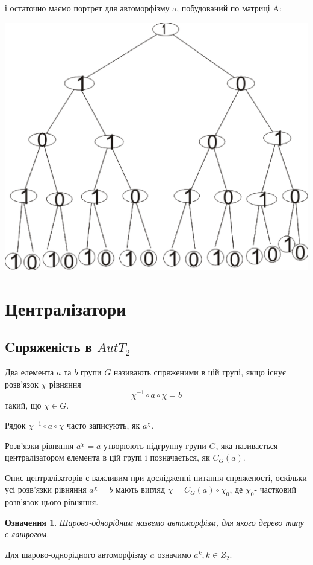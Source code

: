 \documentclass[a4paper,12pt]{article} \usepackage{a4wide}
\numberwithin{equation}{subsection}
\newtheorem{definition}{Означення}[subsection]
\begin{document}
і остаточно маємо портрет для автоморфізму a, побудований по матриці A:
\begin{center}
\includegraphics[scale=0.4]{m2plup4.eps}
\end{center}
\bigskip
\newpage



\section{Централізатори}
\subsection{Cпряженість в $AutT_2$}
Два елемента $a$ та $b$ групи $G$ називають спряженими в цій групі,
 якщо існує розв'язок $\chi$ рівняння $$\chi^{-1}\circ a\circ \chi=b$$ такий, що $\chi \in G$.

 Рядок $\chi^{-1}\circ a\circ \chi$ часто записують, як $a^\chi$.

 Розв'язки рівняння $a^\chi=a$ утворюють підгруппу групи $G$, яка називається централізатором елемента в цій групі
 і позначається, як $C_G(a)$.


 Опис централізаторів є важливим при дослідженні питання спряженості,
  оскільки усі розв'язки рівняння $a^\chi =b$ мають вигляд $\chi=C_G(a) \circ \chi_0$, де $\chi_0$- частковий розв'язок цього рівняння.
  \begin{definition}
  Шарово-однорідним назвемо автоморфізм, для якого дерево типу є ланцюгом.
\end{definition}
Для шарово-однорідного автоморфізму $a$ означимо $a^{k}, k\in Z_2$.
\end{document}

